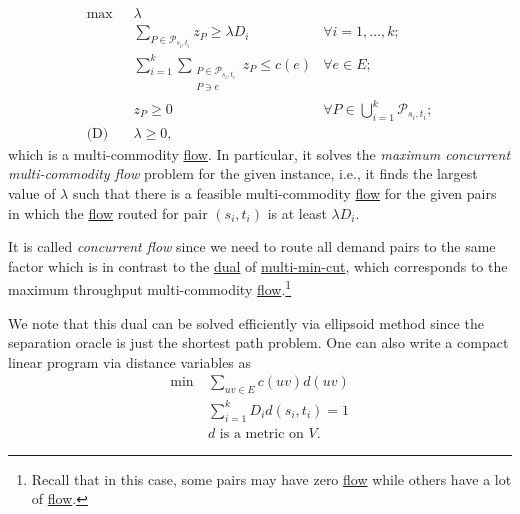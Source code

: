 \begin{equation}\label{eq:non-uniform-sparsest-cut-LP-dual}
	\begin{aligned}
		\max~           & \lambda                                                                                                                 \\
		                & \sum_{P \in \mathcal{P} _{s_i, t_i}} z_P \geq \lambda D_i    & \forall i = 1, \dots , k;                                \\
		                & \sum_{i=1}^{k} \sum_{\substack{P \in \mathcal{P} _{s_i, t_i}                                                            \\ P \ni e}} z_P \leq c(e) & \forall e \in E;                                         \\
		                & z_P \geq 0                                                   & \forall P \in \bigcup_{i=1}^{k} \mathcal{P} _{s_i, t_i}; \\
		\text{(D)}\quad & \lambda \geq 0,
	\end{aligned}
\end{equation}
which is a multi-commodity \hyperref[def:flow]{flow}. In particular, it solves the \emph{maximum concurrent multi-commodity flow} problem for the given instance, i.e., it finds the largest value of \(\lambda \) such that there is a feasible multi-commodity \hyperref[def:flow]{flow} for the given pairs in which the \hyperref[def:flow]{flow} routed for pair \((s_i, t_i)\) is at least \(\lambda D_i\).

\begin{notation}
	It is called \emph{concurrent flow} since we need to route all demand pairs to the same factor which is in contrast to the \hyperref[eq:multi-min-cut-LP]{dual} of \hyperref[prb:multi-min-cut]{multi-min-cut}, which corresponds to the maximum throughput multi-commodity \hyperref[def:flow]{flow}.\footnote{Recall that in this case, some pairs may have zero \hyperref[def:flow]{flow} while others have a lot of \hyperref[def:flow]{flow}.}
\end{notation}

We note that this dual can be solved efficiently via ellipsoid method since the separation oracle is just the shortest path problem. One can also write a compact linear program via distance variables as
\[
	\begin{aligned}
		\min~ & \sum_{uv \in E} c(uv) d(uv)        \\
		      & \sum_{i=1}^{k} D_i d(s_i, t_i) = 1 \\
		      & \text{\(d\) is a metric on \(V\)}.
	\end{aligned}
\]

